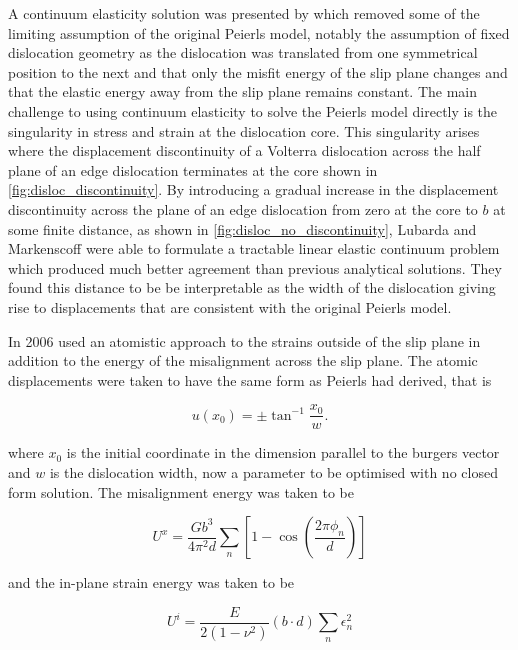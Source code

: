 A continuum elasticity solution was presented by \citet{Lubarda2007} which removed some of the limiting assumption of the original Peierls model, notably the assumption of fixed dislocation geometry as the dislocation was translated from one symmetrical position to the next and that only the misfit energy of the slip plane changes and that the elastic energy away from the slip plane remains constant. The main challenge to using continuum elasticity to solve the Peierls model directly is the singularity in stress and strain at the dislocation core. 
This singularity arises where the displacement discontinuity of a Volterra dislocation across the half plane of an edge dislocation terminates at the core shown in \autoref{fig:disloc_discontinuity}. 
By introducing a gradual increase in the displacement discontinuity across the plane of an edge dislocation from zero at the core to $b$ at some finite distance, as shown in \ref{fig:disloc_no_discontinuity}, Lubarda and Markenscoff were able to formulate a tractable linear elastic continuum problem which produced much better agreement than previous analytical solutions. They found this distance to be be interpretable as the width of the dislocation giving rise to displacements that are consistent with the original Peierls model. 



In 2006 \citet{Clegg2006} used an atomistic approach to the strains outside of the slip plane in addition to the energy of the misalignment across the slip plane. The atomic displacements were taken to have the same form as Peierls had derived, that is

\begin{equation}
u(x_0) = \pm \tan^{-1}\frac{x_0}{w}.
\end{equation}

where $x_0$ is the initial coordinate in the dimension parallel to the burgers vector and $w$ is the dislocation width, now a parameter to be optimised with no closed form solution. The misalignment energy was taken to be

\begin{equation}
U^{x} = \frac{Gb^3}{4\pi^2 d} \sum_n \left[ 1 - \cos \left(\frac{2\pi \phi_n}{d} \right)\right]
\end{equation}
 
 and the in-plane strain energy was taken to be 
 
 \begin{equation}
 U^i = \frac{E}{2(1-\nu^2)} (b\cdot d) \sum_n \epsilon_n^2
 \end{equation}

